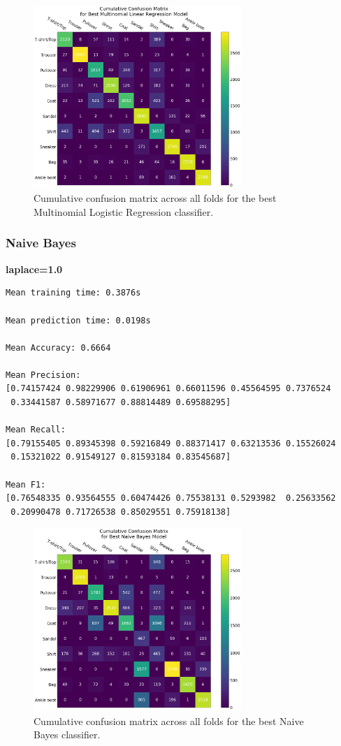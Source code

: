 \documentclass[11pt,a4paper]{article}
\begin{document}
\begin{figure}[H]
    \centering
    \includegraphics[width=0.7\textwidth]{img/conf_mat_mlr.png}
    \caption{Cumulative confusion matrix across all folds for the best Multinomial Logistic Regression classifier.}
    \label{fig:conf_mat_mlr}
\end{figure}

\pagebreak

\subsubsection*{Naive Bayes}
\textbf{laplace=1.0}
\begin{verbatim}
Mean training time: 0.3876s

Mean prediction time: 0.0198s

Mean Accuracy: 0.6664

Mean Precision:
[0.74157424 0.98229906 0.61906961 0.66011596 0.45564595 0.7376524
 0.33441587 0.58971677 0.88814489 0.69588295]

Mean Recall:
[0.79155405 0.89345398 0.59216849 0.88371417 0.63213536 0.15526024
 0.15321022 0.91549127 0.81593184 0.83545687]

Mean F1:
[0.76548335 0.93564555 0.60474426 0.75538131 0.5293982  0.25633562
 0.20990478 0.71726538 0.85029551 0.75918138]
\end{verbatim}

\begin{figure}[H]
    \centering
    \includegraphics[width=0.7\textwidth]{img/conf_mat_nb.png}
    \caption{Cumulative confusion matrix across all folds for the best Naive Bayes classifier.}
    \label{fig:conf_mat_nb}
\end{figure}
\end{document}
